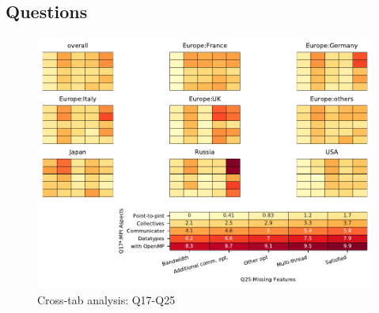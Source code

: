 
\subsection{Questions}


\begin{figure}
\begin{center}
\includegraphics[width=12cm]{../pdfs/Q17-Q25.pdf}
\caption{Cross-tab analysis: Q17-Q25}
\label{fig:Q17-Q25}
\end{center}
\end{figure}
